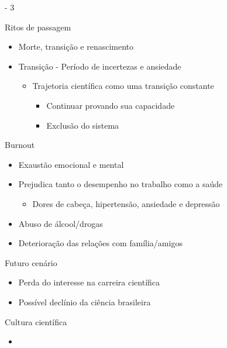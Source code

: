 \documentclass[bigger]{beamer}
\begin{document}
\begin{frame}[label={sec:org3c6c178}]{\cite{demeis2003} - 3}
\begin{block}{Ritos de passagem}
\begin{itemize}
\item Morte, transição e renascimento
\item Transição - Período de incertezas e ansiedade
\begin{itemize}
\item Trajetoria científica como uma transição constante
\begin{itemize}
\item Continuar provando sua capacidade
\item Exclusão do sistema
\end{itemize}
\end{itemize}
\end{itemize}
\end{block}

\begin{block}{Burnout}
\begin{itemize}
\item Exaustão emocional e mental
\item Prejudica tanto o desempenho no trabalho como a saúde
\begin{itemize}
\item Dores de cabeça, hipertensão, ansiedade e depressão
\end{itemize}
\item Abuso de álcool/drogas
\item Deterioração das relações com família/amigos
\end{itemize}
\end{block}

\begin{block}{Futuro cenário}
\begin{itemize}
\item Perda do interesse na carreira científica
\item Possível declínio da ciência brasileira
\end{itemize}
\end{block}
\end{frame}

\begin{frame}[label={sec:org4ffa7bd}]{Cultura científica}
\begin{itemize}
\item \cite{trust2020}
\end{itemize}
\end{frame}
\end{document}
